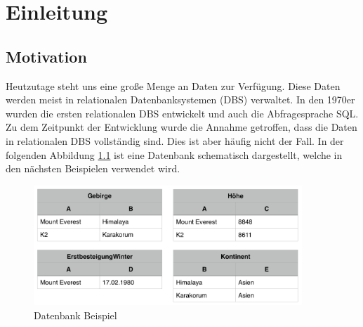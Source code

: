 \documentclass[draft,final]{vutinfth} %
\newcommand{\todo}[1]{{\color{red}\textbf{TODO: {#1}}}} %
\begin{document}
\frontmatter %

\addstatementpage

%
%
%


\tableofcontents %

\mainmatter

\chapter{Einleitung}
\section*{Motivation}
Heutzutage steht uns eine gro\ss e Menge an Daten zur Verfügung. Diese Daten werden meist in relationalen Datenbanksystemen (DBS) verwaltet. In den 1970er wurden die ersten relationalen DBS entwickelt und auch die Abfragesprache SQL. Zu dem Zeitpunkt der Entwicklung wurde die Annahme getroffen, dass die Daten in relationalen DBS vollständig sind. Dies ist aber häufig nicht der Fall. In der folgenden Abbildung \ref{dbBsp} ist eine Datenbank schematisch dargestellt, welche in den nächsten Beispielen verwendet wird.

\begin{figure}[ht]
	\centering
	\includegraphics[width=0.9\textwidth]{DB-Beispiel}
	\caption{Datenbank Beispiel}
	\label{dbBsp}
\end{figure}
\end{document}
